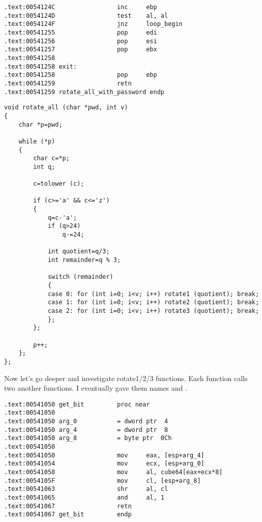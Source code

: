 
\begin{lstlisting}
.text:0054124C                 inc     ebp
.text:0054124D                 test    al, al
.text:0054124F                 jnz     loop_begin
.text:00541255                 pop     edi
.text:00541256                 pop     esi
.text:00541257                 pop     ebx
.text:00541258
.text:00541258 exit:
.text:00541258                 pop     ebp
.text:00541259                 retn
.text:00541259 rotate_all_with_password endp
\end{lstlisting}


\begin{lstlisting}
void rotate_all (char *pwd, int v)
{
	char *p=pwd;

	while (*p)
	{
		char c=*p;
		int q;

		c=tolower (c);

		if (c>='a' && c<='z')
		{
			q=c-'a';
			if (q>24)
				q-=24;

			int quotient=q/3;
			int remainder=q % 3;

			switch (remainder)
			{
			case 0: for (int i=0; i<v; i++) rotate1 (quotient); break;
			case 1: for (int i=0; i<v; i++) rotate2 (quotient); break;
			case 2: for (int i=0; i<v; i++) rotate3 (quotient); break;
			};
		};

		p++;
	};
};
\end{lstlisting}

{Now let's go deeper and investigate rotate1/2/3 functions. 
Each function calls two another functions. 
I eventually gave them names  and .}


\begin{lstlisting}
.text:00541050 get_bit         proc near
.text:00541050
.text:00541050 arg_0           = dword ptr  4
.text:00541050 arg_4           = dword ptr  8
.text:00541050 arg_8           = byte ptr  0Ch
.text:00541050
.text:00541050                 mov     eax, [esp+arg_4]
.text:00541054                 mov     ecx, [esp+arg_0]
.text:00541058                 mov     al, cube64[eax+ecx*8]
.text:0054105F                 mov     cl, [esp+arg_8]
.text:00541063                 shr     al, cl
.text:00541065                 and     al, 1
.text:00541067                 retn
.text:00541067 get_bit         endp
\end{lstlisting}

